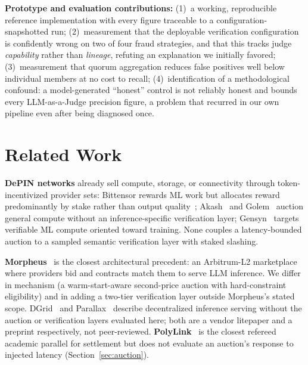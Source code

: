 \documentclass[conference]{IEEEtran}
\begin{document}
\textbf{Prototype and evaluation contributions:} (1)~a working, reproducible reference
implementation with every figure traceable to a configuration-snapshotted run; (2)~measurement
that the deployable verification configuration is confidently wrong on two of four fraud
strategies, and that this tracks judge \emph{capability} rather than \emph{lineage}, refuting an
explanation we initially favored; (3)~measurement that quorum aggregation reduces false positives
well below individual members at no cost to recall; (4)~identification of a methodological
confound: a model-generated ``honest'' control is not reliably honest and bounds every
LLM-as-a-Judge precision figure, a problem that recurred in our own pipeline even after being
diagnosed once.

\section{Related Work}

\textbf{DePIN networks} already sell compute, storage, or connectivity through token-incentivized
provider sets: Bittensor rewards ML work but allocates reward predominantly by stake rather than
output quality~\cite{bittensor}; Akash~\cite{akash} and Golem~\cite{golem} auction general compute
without an inference-specific verification layer; Gensyn~\cite{gensyn} targets verifiable ML
compute oriented toward training. None couples a latency-bounded auction to a sampled semantic
verification layer with staked slashing.

\textbf{Morpheus}~\cite{morpheus,morpheusnode} is the closest architectural precedent: an
Arbitrum-L2 marketplace where providers bid and contracts match them to serve LLM inference. We
differ in mechanism (a warm-start-aware second-price auction with hard-constraint eligibility) and
in adding a two-tier verification layer outside Morpheus's stated scope. DGrid~\cite{dgrid} and
Parallax~\cite{parallax} describe decentralized inference serving without the auction or
verification layers evaluated here; both are a vendor litepaper and a preprint respectively, not
peer-reviewed. \textbf{PolyLink}~\cite{polylink} is the closest refereed academic parallel for
settlement but does not evaluate an auction's response to injected latency
(Section~\ref{sec:auction}).
\end{document}

